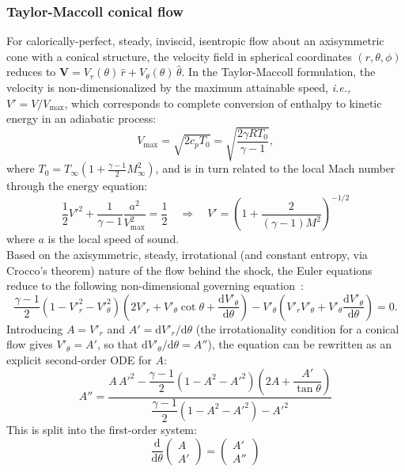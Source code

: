 \documentclass[10pt,a4paper]{article}
\begin{document}
\subsubsection{Taylor-Maccoll conical flow}
For calorically-perfect, steady, inviscid, isentropic flow about an axisymmetric cone with a conical structure, the velocity field in spherical coordinates $(r, \theta, \phi)$ reduces to $\mathbf{V} = V_r(\theta)\,\hat{r} + V_\theta(\theta)\,\hat{\theta}$. In the Taylor-Maccoll formulation, the velocity is non-dimensionalized by the maximum attainable speed, \textit{i.e.,} $V'=V/V_{\max}$, which corresponds to complete conversion of enthalpy to kinetic energy in an adiabatic process:
\begin{equation}
    V_{\max} = \sqrt{2 c_p T_0} = \sqrt{\frac{2 \gamma R T_0}{\gamma - 1}},
    \label{eq:Vmax}
\end{equation}
where $T_0=T_\infty\!\left(1 + \tfrac{\gamma-1}{2}M_\infty^2\right)$, and is in turn related to the local Mach number through the energy equation:
\begin{equation}
    \frac{1}{2} V'^2 + \frac{1}{\gamma - 1}\frac{a^2}{V_{\max}^2} = \frac{1}{2}
    \quad\Longrightarrow\quad
    V' = {\left(1 + \frac{2}{(\gamma-1)M^2}\right)}^{-1/2}
    \label{eq:Vprime}
\end{equation}
where $a$ is the local speed of sound.\\

Based on the axisymmetric, steady, irrotational (and constant entropy, via Crocco's theorem) nature of the flow behind the shock, the Euler equations reduce to the following non-dimensional governing equation~\citep{Maccoll:1937}:
\begin{equation}
    \frac{\gamma-1}{2}
    \left(1 - V'^2_r - V'^2_\theta\right)
    \left(2V'_r + V'_\theta\cot\theta + \frac{\mathrm{d}V'_\theta}{\mathrm{d}\theta}\right)
    - V'_\theta\left(V'_r V'_\theta + V'_\theta\frac{\mathrm{d}V'_\theta}{\mathrm{d}\theta}\right) = 0.
    \label{eq:TM_raw}
\end{equation}
Introducing $A = V'_r$ and $A' = \mathrm{d}V'_r/\mathrm{d}\theta$ (the irrotationality condition for a conical flow gives $V'_\theta = A'$, so that $\mathrm{d}V'_\theta/\mathrm{d}\theta = A''$), the equation can be rewritten as an explicit second-order ODE for $A$:
\begin{equation}
    A'' = \frac{A\,A'^2 - \dfrac{\gamma-1}{2}(1-A^2-A'^2)\!\left(2A + \dfrac{A'}{\tan\theta}\right)}
              {\dfrac{\gamma-1}{2}(1-A^2-A'^2) - A'^2}\label{eq:TM}
\end{equation}
This is split into the first-order system:
\begin{equation}
    \frac{\mathrm{d}}{\mathrm{d}\theta}
    \begin{pmatrix} A \\ A' \end{pmatrix} =
    \begin{pmatrix} A' \\ A'' \end{pmatrix}
\end{equation}
\end{document}
